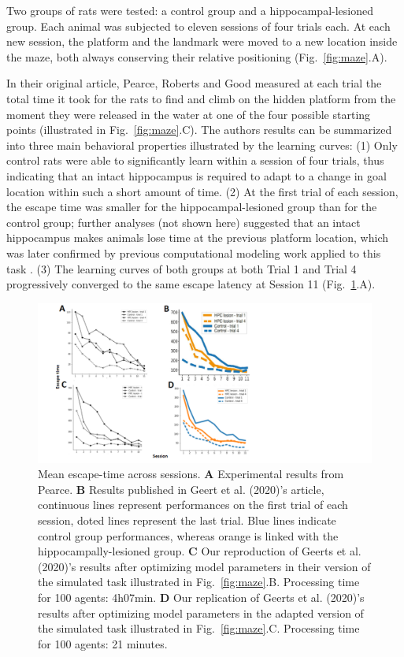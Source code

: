 Two groups of rats were tested: a control group and a hippocampal-lesioned group. Each animal was subjected to eleven sessions of four trials each. At each new session, the platform and the landmark were moved to a new location inside the maze, both always conserving their relative positioning (Fig.~\ref{fig:maze}.A).

In their original article, Pearce, Roberts and Good \cite{Pearce:1998} measured at each trial the total time it took for the rats to find and climb on the hidden platform from the moment they were released in the water at one of the four possible starting points (illustrated in Fig.~\ref{fig:maze}.C).  The authors results can be summarized into three main behavioral properties illustrated by the learning curves: (1) Only control rats were able to significantly learn within a session of four trials, thus indicating that an intact hippocampus is required to adapt to a change in goal location within such a short amount of time. (2) At the first trial of each session, the escape time was smaller for the hippocampal-lesioned group than for the control group; further analyses (not shown here) suggested that an intact hippocampus makes animals lose time at the previous platform location, which was later confirmed by previous computational modeling work applied to this task \cite{Dolle:2018}. (3) The learning curves of both groups at both Trial 1 and Trial 4 progressively converged to the same escape latency at Session 11 (Fig.~\ref{fig:learningCurves}.A).


\begin{figure}[htp]
    \centering
    \includegraphics[width=20cm]{results.png}
    \caption{Mean escape-time across sessions. 
    {\bf A} Experimental results from Pearce. 
    {\bf B} Results published in Geert et al. (2020)'s article, continuous lines represent performances on the first trial of each session, doted lines represent the last trial. Blue lines indicate control group performances, whereas orange is linked with the hippocampally-lesioned group. 
    {\bf C} Our reproduction of Geerts et al. (2020)'s results after optimizing model parameters in their version of the simulated task illustrated in Fig.~\ref{fig:maze}.B. Processing time for 100 agents: 4h07min.
    {\bf D} Our replication of Geerts et al. (2020)'s results after optimizing model parameters in the adapted version of the simulated task illustrated in Fig.~\ref{fig:maze}.C.
    Processing time for 100 agents: 21 minutes.}
    \label{fig:learningCurves}
    
\end{figure}


